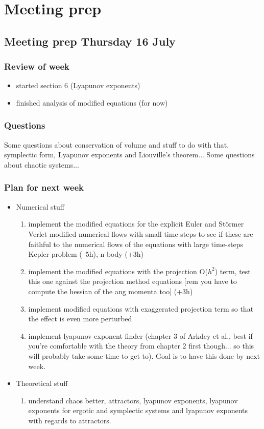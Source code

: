 \documentclass[12pt]{article}
\begin{document}
\section{Meeting prep}
\subsection{Meeting prep Thursday 16 July}
\subsubsection{Review of week}
\begin{itemize}
    \item started section 6 (Lyapunov exponents)
    \item finished analysis of modified equations (for now)
\end{itemize}
\subsubsection{Questions}
Some questions about conservation of volume and stuff to do with that, symplectic form, Lyapunov exponents and Liouville's theorem... Some questions about chaotic systems...
\subsubsection{Plan for next week}
\begin{itemize}
    \item Numerical stuff
    \begin{enumerate}
        \item implement the modified equations for the explicit Euler and St\"ormer Verlet modified numerical flows with small time-steps to see if these are faithful to the numerical flows of the equations with large time-steps Kepler problem (~5h), n body (+3h)
        \item implement the modified equations with the projection O($h^2$) term, test this one against the projection method equations [rem you have to compute the hessian of the ang momenta too] (+3h)
        \item implement modified equations with exaggerated projection term so that the effect is even more perturbed
        \item implement lyapunov exponent finder (chapter 3 of Arkdey et al., best if you're comfortable with the theory from chapter 2 first though... so this will probably take some time to get to). Goal is to have this done by next week.
    \end{enumerate}
    \item Theoretical stuff
    \begin{enumerate}
        \item understand chaos better, attractors, lyapunov exponents, lyapunov exponents for ergotic and symplectic systems and lyapunov exponents with regards to attractors. 
    \end{enumerate}
\end{itemize}
\end{document}
